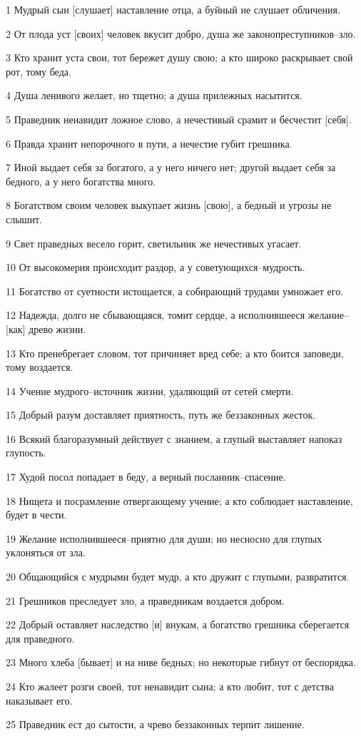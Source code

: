 \par 1 Мудрый сын [слушает] наставление отца, а буйный не слушает обличения.
\par 2 От плода уст [своих] человек вкусит добро, душа же законопреступников--зло.
\par 3 Кто хранит уста свои, тот бережет душу свою; а кто широко раскрывает свой рот, тому беда.
\par 4 Душа ленивого желает, но тщетно; а душа прилежных насытится.
\par 5 Праведник ненавидит ложное слово, а нечестивый срамит и бесчестит [себя].
\par 6 Правда хранит непорочного в пути, а нечестие губит грешника.
\par 7 Иной выдает себя за богатого, а у него ничего нет; другой выдает себя за бедного, а у него богатства много.
\par 8 Богатством своим человек выкупает жизнь [свою], а бедный и угрозы не слышит.
\par 9 Свет праведных весело горит, светильник же нечестивых угасает.
\par 10 От высокомерия происходит раздор, а у советующихся--мудрость.
\par 11 Богатство от суетности истощается, а собирающий трудами умножает его.
\par 12 Надежда, долго не сбывающаяся, томит сердце, а исполнившееся желание--[как] древо жизни.
\par 13 Кто пренебрегает словом, тот причиняет вред себе; а кто боится заповеди, тому воздается.
\par 14 Учение мудрого--источник жизни, удаляющий от сетей смерти.
\par 15 Добрый разум доставляет приятность, путь же беззаконных жесток.
\par 16 Всякий благоразумный действует с знанием, а глупый выставляет напоказ глупость.
\par 17 Худой посол попадает в беду, а верный посланник--спасение.
\par 18 Нищета и посрамление отвергающему учение; а кто соблюдает наставление, будет в чести.
\par 19 Желание исполнившееся--приятно для души; но несносно для глупых уклоняться от зла.
\par 20 Общающийся с мудрыми будет мудр, а кто дружит с глупыми, развратится.
\par 21 Грешников преследует зло, а праведникам воздается добром.
\par 22 Добрый оставляет наследство [и] внукам, а богатство грешника сберегается для праведного.
\par 23 Много хлеба [бывает] и на ниве бедных; но некоторые гибнут от беспорядка.
\par 24 Кто жалеет розги своей, тот ненавидит сына; а кто любит, тот с детства наказывает его.
\par 25 Праведник ест до сытости, а чрево беззаконных терпит лишение.

